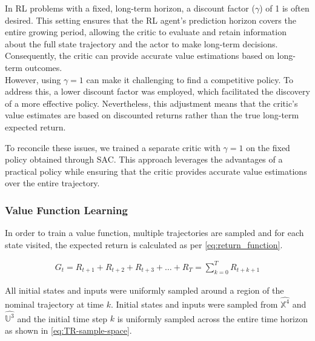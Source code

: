 In RL problems with a fixed, long-term horizon, a discount factor ($\gamma$)
of 1 is often desired. This setting ensures that the RL agent's prediction horizon covers the entire growing period, allowing the critic to evaluate and retain information about the full state trajectory and the actor to make long-term decisions. Consequently, the critic can provide accurate value estimations based on long-term outcomes.\\
However, using $\gamma = 1$ can make it challenging to find a competitive policy. To address this, a lower discount factor was employed, which facilitated the discovery of a more effective policy. Nevertheless, this adjustment means that the critic's value estimates are based on discounted returns rather than the true long-term expected return.

To reconcile these issues, we trained a separate critic with $\gamma = 1$ on the fixed policy obtained through SAC. This approach leverages the advantages of a practical policy while ensuring that the critic provides accurate value estimations over the entire trajectory.


\subsubsection{Value Function Learning}
In order to train a value function, multiple trajectories are sampled and for each state visited, the expected return is calculated as per \autoref{eq:return_function}. 

\begin{equation}
	\begin{aligned}
		G_t  = R_{t+1} + R_{t+2} + R_{t+3} + \dots + R_{T} = \sum_{k=0}^TR_{t+k+1}
	\end{aligned}
	\label{eq:return_function}
\end{equation}

All initial states and inputs were uniformly sampled around a region of the nominal trajectory at time $k$. Initial states and inputs were sampled from $\hat{\mathbb{X}^4}$ and $\hat{\mathbb{U}^3}$ and the initial time step $k$ is uniformly sampled across the entire time horizon as shown in \autoref{eq:TR-sample-space}.


